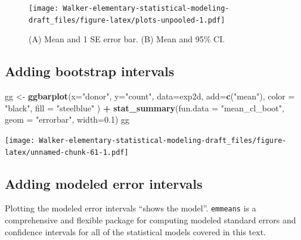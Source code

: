\documentclass[]{book}
\newenvironment{Shaded}{\begin{snugshade}}{\end{snugshade}}
\newcommand{\KeywordTok}[1]{\textcolor[rgb]{0.13,0.29,0.53}{\textbf{#1}}}
\newcommand{\DataTypeTok}[1]{\textcolor[rgb]{0.13,0.29,0.53}{#1}}
\newcommand{\FloatTok}[1]{\textcolor[rgb]{0.00,0.00,0.81}{#1}}
\newcommand{\StringTok}[1]{\textcolor[rgb]{0.31,0.60,0.02}{#1}}
\newcommand{\OperatorTok}[1]{\textcolor[rgb]{0.81,0.36,0.00}{\textbf{#1}}}
\newcommand{\NormalTok}[1]{#1}
\begin{document}
\begin{figure}
\centering
\texttt{[image: Walker-elementary-statistical-modeling-draft\_files/figure-latex/plots-unpooled-1.pdf]}
\caption{\label{fig:plots-unpooled}(A) Mean and 1 SE error bar. (B) Mean and
95\% CI.}
\end{figure}

\subsection{Adding bootstrap
intervals}\label{adding-bootstrap-intervals}

\begin{Shaded}
\begin{Highlighting}[]
\NormalTok{gg <-}\StringTok{ }\KeywordTok{ggbarplot}\NormalTok{(}\DataTypeTok{x=}\StringTok{"donor"}\NormalTok{, }
                \DataTypeTok{y=}\StringTok{"count"}\NormalTok{, }
                \DataTypeTok{data=}\NormalTok{exp2d,}
                \DataTypeTok{add=}\KeywordTok{c}\NormalTok{(}\StringTok{"mean"}\NormalTok{),}
                \DataTypeTok{color =} \StringTok{"black"}\NormalTok{,}
                \DataTypeTok{fill =} \StringTok{"steelblue"}
\NormalTok{) }\OperatorTok{+}\StringTok{ }
\StringTok{  }\KeywordTok{stat_summary}\NormalTok{(}\DataTypeTok{fun.data =} \StringTok{"mean_cl_boot"}\NormalTok{, }\DataTypeTok{geom =} \StringTok{"errorbar"}\NormalTok{, }\DataTypeTok{width=}\FloatTok{0.1}\NormalTok{)}
\NormalTok{gg}
\end{Highlighting}
\end{Shaded}

\texttt{[image: Walker-elementary-statistical-modeling-draft\_files/figure-latex/unnamed-chunk-61-1.pdf]}

\subsection{Adding modeled error
intervals}\label{adding-modeled-error-intervals}

Plotting the modeled error intervals ``shows the model''.
\texttt{emmeans} is a comprehensive and flexible package for computing
modeled standard errors and confidence intervals for all of the
statistical models covered in this text.
\end{document}
